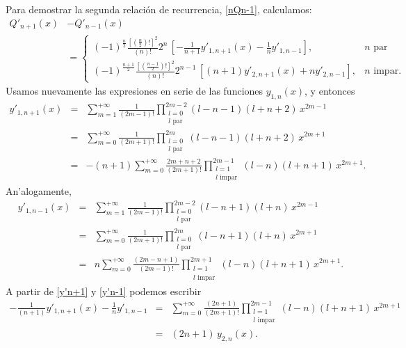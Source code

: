 Para demostrar la segunda relaci\'on de recurrencia, \eqref{nQn-1}, calculamos:
\begin{align}
Q'_{n+1}(x) &- Q'_{n-1}(x) \\
&=\begin{cases}
	(-1)^{\frac{n}{2}}\frac{[(\frac{n}{2})!]^2}{(n)!} 2^{n} \, \left[ -\frac{1}{n+1}y'_{1,n+1}(x)-\frac{1}{n}y'_{1,n-1} \right], & n \text{ par}\\
	(-1)^{\frac{n+1}{2}}\frac{\left[\left(\frac{n-1}{2}\right)!\right]^2}{(n)!}2^{n-1}\,\left[ (n+1)y'_{2,n+1}(x)+ny'_{2,n-1} \right] , & n \text{ impar}.
	\end{cases} \label{q'}
\end{align}
Usamos nuevamente las expresiones en serie de las funciones $y_{1,n}(x)$, y entonces
\begin{eqnarray}
y'_{1,n+1}(x)&=&\sum_{m= 1}^{+\infty}\frac{1}{(2m-1)!}
\prod_{\substack{l=0 \\ l \text{ par}}}^{2m-2}
(l-n-1)(l+n+2)\,x^{2m-1} \\
&=&\sum_{m= 0}^{+\infty}\frac{1}{(2m+1)!}
\prod_{\substack{l=0 \\ l \text{ par}}}^{2m}
(l-n-1)(l+n+2)\,x^{2m+1} \\
&=&-(n+1)\sum_{m= 0}^{+\infty}\frac{2m+n+2}{(2m+1)!}
\prod_{\substack{l=1 \\ l \text{ impar}}}^{2m-1}
(l-n)(l+n+1)\,x^{2m+1}. \label{y'n+1}
\end{eqnarray}
An'alogamente,
\begin{eqnarray}
y'_{1,n-1}(x)&=&\sum_{m= 1}^{+\infty}\frac{1}{(2m-1)!}
\prod_{\substack{l=0 \\ l \text{ par}}}^{2m-2}
(l-n+1)(l+n)\,x^{2m-1} \\
&=&\sum_{m= 0}^{+\infty}\frac{1}{(2m+1)!}
\prod_{\substack{l=0 \\ l \text{ par}}}^{2m}
(l-n+1)(l+n)\,x^{2m+1} \\
&=&n\sum_{m= 0}^{+\infty}\frac{(2m-n+1)}{(2m-1)!}
\prod_{\substack{l=1 \\ l \text{ impar}}}^{2m+1}
(l-n)(l+n+1)\,x^{2m+1}. \label{y'n-1}
\end{eqnarray}
A partir de \eqref{y'n+1} y \eqref{y'n-1} podemos escribir
\begin{eqnarray}
-\frac{1}{(n+1)}y'_{1,n+1}(x)-\frac{1}{n}y'_{1,n-1}&=&\sum_{m= 0}^{+\infty}\frac{(2n+1)}{(2m+1)!}
\prod_{\substack{l=1 \\ l \text{ impar}}}^{2m-1}
(l-n)(l+n+1)\,x^{2m+1}\\
&=&(2n+1)\,y_{2,n}(x). \label{2n-1y2}
\end{eqnarray}

